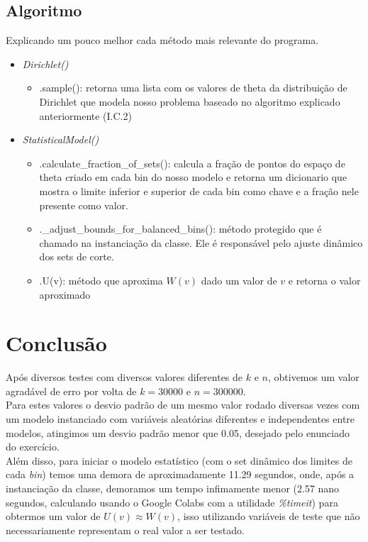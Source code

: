 \documentclass[twocolumn,amsmath,amssymb,floatfix]{revtex4}
\begin{document}
\subsection{Algoritmo}
\indent Explicando um pouco melhor cada método mais relevante do programa.
\begin{itemize}
    \item \textit{Dirichlet()}
    \begin{itemize}
        \item .sample(): retorna uma lista com os valores de theta da distribuição de Dirichlet que modela nosso problema baseado no algoritmo explicado anteriormente (I.C.2)
    \end{itemize}
\end{itemize}
\begin{itemize}
\item \textit{StatisticalModel()}
    \begin{itemize}
        \item .calculate\_fraction\_of\_sets(): calcula a fração de pontos do espaço de theta criado em cada bin do nosso modelo e retorna um dicionario que mostra o limite inferior e superior de cada bin como chave e a fração nele presente como valor.
        \item .\_adjust\_bounds\_for\_balanced\_bins(): método protegido que é chamado na instanciação da classe. Ele é responsável pelo ajuste dinâmico dos sets de corte.
        \item .U(v): método que aproxima $W(v)$ dado um valor de $v$ e retorna o valor aproximado 
    \end{itemize}
\end{itemize}
\section{Conclusão}
\indent Após diversos testes com diversos valores diferentes de $k$ e $n$, obtivemos um valor agradável de erro por volta de $k = 30000$ e $n = 300000$. \\
\indent Para estes valores o desvio padrão de um mesmo valor rodado diversas vezes com um modelo instanciado com variáveis aleatórias diferentes e independentes entre modelos, atingimos um desvio padrão menor que 0.05, desejado pelo enunciado do exercício. \\
\indent Além disso, para iniciar o modelo estatístico (com o set dinâmico dos limites de cada \textit{bin}) temos uma demora de aproximadamente 11.29 segundos, onde, após a instanciação da classe, demoramos um tempo infimamente menor (2.57 nano segundos, calculando usando o Google Colabs com a utilidade \textit{\%timeit}) para obtermos um valor de $U(v) \approx W(v)$, isso utilizando variáveis de teste que não necessariamente representam o real valor a ser testado.
\indent 
\indent 
\end{document}

